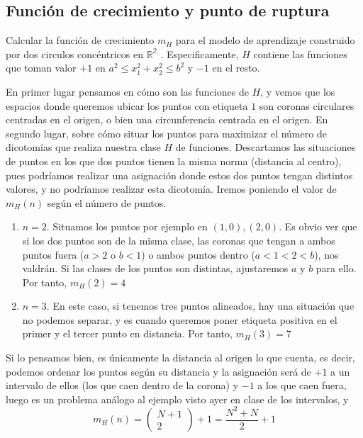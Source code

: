 \documentclass[11pt,leqno]{article}
\theoremstyle{definition}
\begin{document}
\subsection{Función de crecimiento y punto de ruptura}
\begin{cuestion}
Calcular la función de crecimiento $m_H$ para el modelo de aprendizaje construido
por dos circulos concéntricos en $\mathbb{R^2}$ . Especificamente, $H$ contiene las funciones que
toman valor $+1$ en $a^2 \leq x_1^2 + x_2^2 \leq b^2$ y $-1$ en el resto.
\end{cuestion}

\begin{solucion}
En primer lugar pensamos en cómo son las funciones de $H$, y vemos que los espacios donde queremos ubicar los puntos con etiqueta $1$ son coronas circulares centradas en el origen, o bien una circunferencia centrada en el origen. En segundo lugar, sobre cómo situar los puntos para maximizar el número de dicotomías que realiza nuestra clase $H$ de funciones. Descartamos las situaciones de puntos en los que dos puntos tienen la misma norma (distancia al centro), pues podríamos realizar una asignación donde estos dos puntos tengan distintos valores, y no podríamos realizar esta dicotomía. Iremos poniendo el valor de $m_H(n)$ según el número de puntos.
\begin{enumerate}
\item $n = 2$. Situamos los puntos por ejemplo en $(1,0), (2,0)$. Es obvio ver que si los dos puntos son de la misma clase, las coronas que tengan a ambos puntos fuera ($a>2$ o $b<1$) o ambos puntos dentro ($a<1<2<b$), nos valdrán. Si las clases de los puntos son distintas, ajustaremos $a$ y $b$ para ello. Por tanto, $m_H(2) = 4$
\item $n = 3$. En este caso, si tenemos tres puntos alineados, hay una situación que no podemos separar, y es cuando queremos poner etiqueta positiva en el primer y el tercer punto en distancia. Por tanto,  $m_H(3) = 7$
\end{enumerate}
Si lo pensamos bien, es únicamente la distancia al origen lo que cuenta, es decir, podemos ordenar los puntos según su distancia y la asignación será de $+1$ a un intervalo de ellos (los que caen dentro de la corona) y $-1$ a los que caen fuera, luego es un problema análogo al ejemplo visto ayer en clase de los intervalos, y
\[ m_H(n) = \left( \begin{array}{c}
N+1 \\
2
\end{array} \right) + 1 = \frac{N^2+N}{2} +1\]
\end{solucion}
\end{document}
